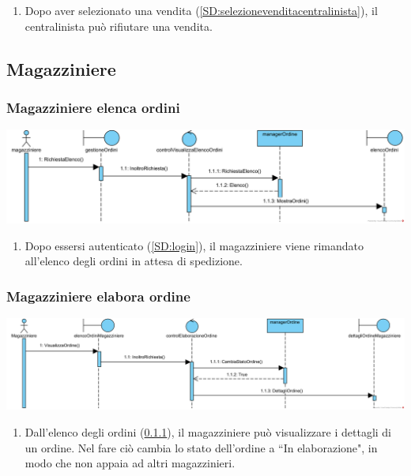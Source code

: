 \documentclass[12pt,a4paper]{article}
\begin{document}
\begin{enumerate}
\item Dopo aver selezionato una vendita (\ref{SD:selezionevenditacentralinista}), il centralinista può rifiutare una vendita.
\end{enumerate}

\newpage

\subsection{Magazziniere}
\subsubsection{Magazziniere elenca ordini}
\label{SD:magazzinierevisualizzaelenco}
\begin{center}
\includegraphics[width=\textwidth]{SequenceDiagram/MagazziniereOrdiniElenco}
\end{center}

\begin{enumerate}
\item Dopo essersi autenticato (\ref{SD:login}), il magazziniere viene rimandato all'elenco degli ordini in attesa di spedizione.
\end{enumerate}

\subsubsection{Magazziniere elabora ordine}
\label{SD:magazziniereblocca}
\begin{center}
\includegraphics[width=\textwidth]{SequenceDiagram/MagazziniereOrdineVisualizza}
\end{center}

\begin{enumerate}
\item Dall'elenco degli ordini (\ref{SD:magazzinierevisualizzaelenco}), il magazziniere può visualizzare i dettagli di un ordine. Nel fare ciò cambia lo stato dell'ordine a ``In elaborazione", in modo che non appaia ad altri magazzinieri.
\end{enumerate}
\end{document}
